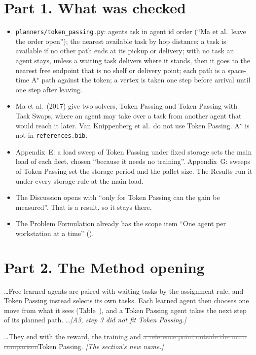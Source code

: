 \documentclass[11pt,a4paper]{article}
\newcommand{\new}[1]{\textcolor{newc}{#1}}
\newcommand{\old}[1]{\textcolor{gray}{\sout{#1}}}
\newcommand{\note}[1]{{\small\itshape [#1]}}
\newcommand{\lab}[1]{\textsf{\footnotesize\detokenize{#1}}}
\renewcommand{\ref}[1]{\lab{#1}}
\begin{document}
\section*{Part 1. What was checked}
\begin{itemize}[nosep]
  \item \texttt{planners/token\_passing.py}: agents ask in agent id order
    (``Ma et al.\ leave the order open''); the nearest available task by hop
    distance; a task is available if no other path ends at its pickup or
    delivery; with no task an agent stays, unless a waiting task delivers
    where it stands, then it goes to the nearest free endpoint that is no
    shelf or delivery point; each path is a space-time A$^\star$ path
    against the token; a vertex is taken one step before arrival until one
    step after leaving.
  \item Ma et al.\ (2017) give two solvers, Token Passing and Token Passing
    with Task Swaps, where an agent may take over a task from another agent
    that would reach it later. Van Knippenberg et al.\ do not use Token
    Passing. A$^\star$ is not in \texttt{references.bib}.
  \item Appendix~E: a load sweep of Token Passing under fixed storage sets
    the main load of each fleet, chosen ``because it needs no training''.
    Appendix~G: sweeps of Token Passing set the storage period and the
    pallet size. The Results run it under every storage rule at the main
    load.
  \item The Discussion opens with ``only for Token Passing can the gain be
    measured''. That is a result, so it stays there.
  \item The Problem Formulation already has the scope item ``One agent per
    workstation at a time'' (\lab{sec:pf:scope}).
\end{itemize}

\section*{Part 2. The Method opening}

\ldots Free learned agents are paired with waiting tasks by the assignment
rule, and Token Passing instead selects its own tasks. Each \new{learned}
agent then chooses one move from what it sees
(Table~\ref{tab:information})\new{, and a Token Passing agent takes the next
step of its planned path}. \ldots \note{A3, step 3 did not fit Token
Passing.}

\ldots They end with the reward, the training and \old{a reference point
outside the main comparison}\new{Token Passing}. \note{The section's new
name.}
\end{document}
